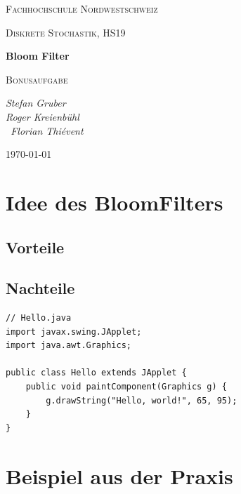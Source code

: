 \documentclass[12pt,a4paper]{report}
\begin{document}
\begin{titlepage}
	\centering
	\qquad
	\par\vspace{1cm}
	{\scshape\LARGE Fachhochschule Nordwestschweiz \par}
	{\scshape\Large Diskrete Stochastik, HS19\par}
	\vspace{5cm}
	{\huge\bfseries Bloom Filter\par}
	{\scshape\Large Bonusaufgabe\par}
	\vspace{2cm}
	{\Large\itshape  Stefan Gruber \\ Roger Kreienbühl \\ Florian Thiévent \par}
	\vfill
	{\large \today\par}
\end{titlepage}

\tableofcontents
\newpage

\chapter{Idee des BloomFilters}\label{ch:idee-des-bloomfilters}
\section{Vorteile}\label{sec:vorteile}
\section{Nachteile}\label{sec:nachteile}
\begin{lstlisting}
// Hello.java
import javax.swing.JApplet;
import java.awt.Graphics;

public class Hello extends JApplet {
    public void paintComponent(Graphics g) {
        g.drawString("Hello, world!", 65, 95);
    }    
}
\end{lstlisting}

\chapter{Beispiel aus der Praxis}\label{ch:beispiel-aus-der-praxis}
\end{document}
